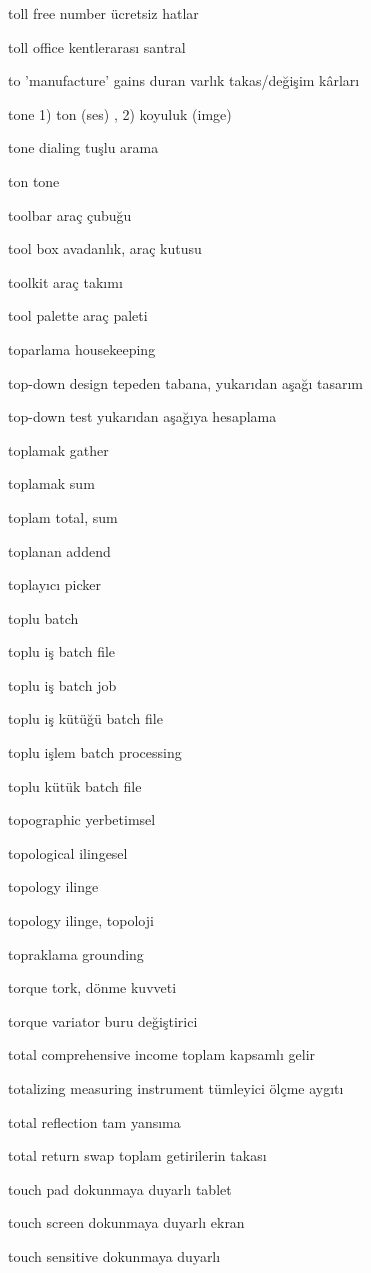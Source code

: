 \documentclass[12pt,fleqn]{article}\usepackage{../../common}
\begin{document}
toll free number ücretsiz hatlar

toll office kentlerarası santral

to 'manufacture' gains duran varlık takas/değişim kârları

tone 1) ton (ses) , 2) koyuluk (imge)

tone dialing tuşlu arama

ton tone

toolbar araç çubuğu

tool box avadanlık, araç kutusu

toolkit araç takımı

tool palette araç paleti

toparlama housekeeping

top-down design tepeden tabana, yukarıdan aşağı tasarım

top-down test yukarıdan aşağıya hesaplama

toplamak gather

toplamak sum

toplam total, sum

toplanan addend

toplayıcı picker

toplu batch

toplu iş batch file

toplu iş batch job

toplu iş kütüğü batch file

toplu işlem batch processing

toplu kütük batch file

topographic yerbetimsel

topological ilingesel

topology ilinge

topology ilinge, topoloji

topraklama grounding

torque tork, dönme kuvveti

torque variator buru değiştirici

total comprehensive income toplam kapsamlı gelir

totalizing measuring instrument tümleyici ölçme aygıtı

total reflection tam yansıma

total return swap toplam getirilerin takası

touch pad dokunmaya duyarlı tablet

touch screen dokunmaya duyarlı ekran

touch sensitive dokunmaya duyarlı
\end{document}
